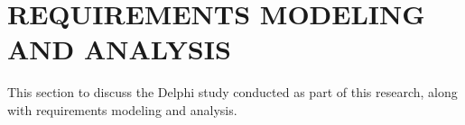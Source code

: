%
%
%
%  
%

\chapter{\MakeUppercase{Requirements Modeling and Analysis}}
\label{cha:requirements}

This section to discuss the Delphi study conducted as part of this research, along with requirements modeling and analysis.